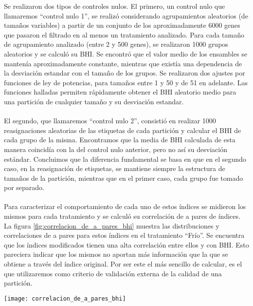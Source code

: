Se realizaron dos tipos de controles nulos. El primero, un control nulo que llamaremos ``control nulo 1'', se realizó considerando agrupamientos aleatorios (de tamaños variables) a partir de un conjunto de los aproximadamente 6000 genes que pasaron el filtrado en al menos un tratamiento analizado. Para cada tamaño de agrupamiento analizado (entre 2 y 500 genes), se realizaron 1000 grupos aleatorios y se calculó su BHI. Se encontró que el valor medio de los ensambles se mantenía aproximadamente constante, mientras que existía una dependencia de la desviación estandar con el tamaño de los grupos. Se realizaron dos ajustes por funciones de ley de potencias, para tamaños entre 1 y 50 y de 51 en adelante. Las funciones halladas permiten rápidamente obtener el BHI aleatorio medio para una partición de cualquier tamaño y su desviación estandar.\\\\
El segundo, que llamaremos ``control nulo 2'', consistió en realizar 1000 reasignaciones aleatorias de las etiquetas de cada partición y calcular el BHI de cada grupo de la misma. Encontramos que la media de BHI calculada de esta manera coincidía con la del control nulo anterior, pero no así su desviación estándar. Concluimos que la diferencia fundamental se basa en que en el segundo caso, en la reasignación de etiquetas, se mantiene siempre la estructura de tamaños de la partición, mientras que en el primer caso, cada grupo fue tomado por separado.\\\\
Para caracterizar el comportamiento de cada uno de estos índices se midieron los mismos para cada tratamiento y se calculó su correlación de a pares de índices. La figura \ref{fig:correlacion_de_a_pares_bhi} muestra las distribuciones y correlaciones de a pares para estos índices en el tratamiento ``Frío''. Se encuentra que los índices modificados tienen una alta correlación entre ellos y con BHI. Esto pareciera indicar que los mismos no aportan más información que la que se obtiene a través del índice original. Por ser este el más sencillo de calcular, es el que utilizaremos como criterio de validación externa de la calidad de una partición.
\begin{sidewaysfigure}
    \centering
    \texttt{[image: correlacion\_de\_a\_pares\_bhi]}
    \caption{Correlación de a pares y distribución para los distintos índices de homogeneidad biológica presentados para cada uno de los grupos del tratamiento 'Frío' obtenidos con $ds=1$. Se observa que todos los índices tienen una alta correlación entre si.}
    \label{fig:correlacion_de_a_pares_bhi}
\end{sidewaysfigure}
\clearpage
